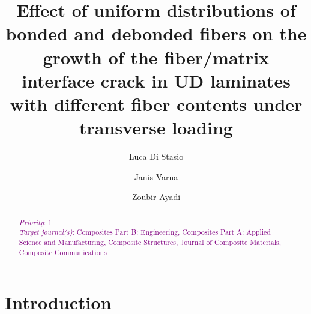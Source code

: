\documentclass[review]{elsarticle}
\begin{document}
\begin{frontmatter}

\title{Effect of uniform distributions of bonded and debonded fibers on the growth of the fiber/matrix interface crack in UD laminates with different fiber contents under transverse loading}


\author[nancy,lulea]{Luca Di Stasio}
\author[lulea]{Janis Varna}
\author[nancy]{Zoubir Ayadi}


\address[nancy]{Universit\'e de Lorraine, EEIGM, IJL, 6 Rue Bastien Lepage, F-54010 Nancy, France}
\address[lulea]{Lule\aa\ University of Technology, University Campus, SE-97187 Lule\aa, Sweden}

\begin{abstract}
\noindent
\textcolor{purple}{{\em Priority}: 1}\\
\textcolor{purple}{{\em Target journal(s)}: Composites Part B: Engineering, Composites Part A: Applied Science and Manufacturing, Composite Structures, Journal of Composite Materials, Composite Communications}\\

\end{abstract}


\end{frontmatter}

\linenumbers

\section{Introduction}
\end{document}
